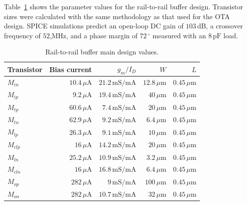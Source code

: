 Table~\ref{tab:buffer_sizes} shows the parameter values for the rail-to-rail buffer design. Transistor sizes were calculated with the same methodology as that used for the OTA design. SPICE simulations predict an open-loop DC gain of $103$\,dB, a crossover frequency of $52$,MHz, and a phase margin of $72\,^\circ$ measured with an $8\,\text{pF}$ load. 
\begin{table}[!t]
	\begin{center}
		\begin{tabular}{|l|r|r|r|r|}\hline
			Transistor & Bias current & $g_m/I_D$ & $W$ & $L$ \\ \hline\hline
			$M_\textit{in}$ & $10.4\,\mu\text{A}$ & $21.2\,\text{mS}/\text{mA}$ & $12.8\,\mu\text{m}$ & $0.45\,\mu\text{m}$ \\ \hline
			$M_\textit{ip}$ & $9.2\,\mu\text{A}$ & $19.4\,\text{mS}/\text{mA}$ & $40\,\mu\text{m}$ & $0.45\,\mu\text{m}$ \\ \hline
			$M_\textit{tp}$ & $60.6\,\mu\text{A}$ & $7.4\,\text{mS}/\text{mA}$ & $20\,\mu\text{m}$ & $0.45\,\mu\text{m}$ \\ \hline
			$M_\textit{tn}$ & $62.9\,\mu\text{A}$ & $9.2\,\text{mS}/\text{mA}$ & $6.4\,\mu\text{m}$ & $0.45\,\mu\text{m}$ \\ \hline
			$M_\textit{lp}$ & $26.3\,\mu\text{A}$ & $9.1\,\text{mS}/\text{mA}$ & $10\,\mu\text{m}$ & $0.45\,\mu\text{m}$ \\ \hline
			$M_\textit{clp}$ & $16\,\mu\text{A}$ & $14.2\,\text{mS}/\text{mA}$ & $20\,\mu\text{m}$ & $0.45\,\mu\text{m}$ \\ \hline
			$M_\textit{ln}$ & $25.2\,\mu\text{A}$ & $10.9\,\text{mS}/\text{mA}$ & $3.2\,\mu\text{m}$ & $0.45\,\mu\text{m}$ \\ \hline
			$M_\textit{cln}$ & $16\,\mu\text{A}$ & $16.8\,\text{mS}/\text{mA}$ & $6.4\,\mu\text{m}$ & $0.45\,\mu\text{m}$ \\ \hline
			$M_\textit{op}$ & $282\,\mu\text{A}$ & $9\,\text{mS}/\text{mA}$ & $100\,\mu\text{m}$ & $0.45\,\mu\text{m}$ \\ \hline
			$M_\textit{on}$ & $282\,\mu\text{A}$ & $10.7\,\text{mS}/\text{mA}$ & $32\,\mu\text{m}$ & $0.45\,\mu\text{m}$ \\\hline
		\end{tabular}
		\vspace*{5pt}
		\caption{Rail-to-rail buffer main design values.}
		\label{tab:buffer_sizes}
	\end{center}
\end{table}
